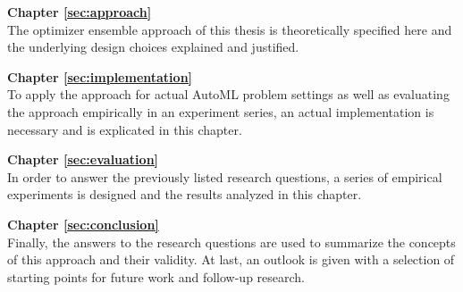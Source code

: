 \textbf{Chapter \ref{sec:approach}} \\[0.2em]
The optimizer ensemble approach of this thesis is theoretically specified here and the underlying design choices explained and justified.

\textbf{Chapter \ref{sec:implementation}} \\[0.2em]
To apply the approach for actual AutoML problem settings as well as evaluating the approach empirically in an experiment series, an actual implementation is necessary and is explicated in this chapter.

\textbf{Chapter \ref{sec:evaluation}} \\[0.2em]
In order to answer the previously listed research questions, a series of empirical experiments is designed and the results analyzed in this chapter.

\textbf{Chapter \ref{sec:conclusion}} \\[0.2em]
Finally, the answers to the research questions are used to summarize the concepts of this approach and their validity.
At last, an outlook is given with a selection of starting points for future work and follow-up research.
